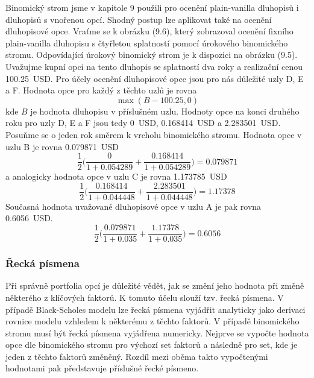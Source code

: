 \documentclass[a4paper]{book}
\begin{document}
Binomický strom jsme v kapitole 9 použili pro ocenění plain-vanilla dluhopisů i dluhopisů s vnořenou opcí. Shodný postup lze aplikovat také na ocenění dluhopisové opce. Vraťme se k obrázku (9.6), který zobrazoval ocenění fixního plain-vanilla dluhopisu s čtyřletou splatností pomocí úrokového binomického stromu. Odpovídající úrokový binomický strom je k dispozici na obrázku (9.5). Uvažujme kupní opci na tento dluhopis se splatností dva roky a realizační cenou 100.25~USD. Pro účely ocenění dluhopisové opce jsou pro nás důležité uzly D, E a F. Hodnota opce pro každý z těchto uzlů je rovna
\begin{equation*}
\max(B - 100.25, 0)
\end{equation*}
kde $B$ je hodnota dluhopisu v příslušném uzlu. Hodnoty opce na konci druhého roku pro uzly D, E a F jsou tedy 0~USD, 0.168414~USD a 2.283501~USD. Posuňme se o jeden rok směrem k vrcholu binomického stromu. Hodnota opce v uzlu B je rovna 0.079871~USD
\begin{equation*}
\frac{1}{2}\Bigg( \frac{0}{1 + 0.054289} + \frac{0.168414}{1 + 0.054289} \Bigg) = 0.079871
\end{equation*}
a analogicky hodnota opce v uzlu C je rovna 1.173785~USD
\begin{equation*}
\frac{1}{2}\Bigg( \frac{0.168414}{1 + 0.044448} + \frac{2.283501}{1 + 0.044448} \Bigg) = 1.17378
\end{equation*}
Současná hodnota uvažované dluhopisové opce v uzlu A je pak rovna 0.6056~USD.
\begin{equation*}
\frac{1}{2}\Bigg( \frac{0.079871}{1 + 0.035} + \frac{1.17378}{1 + 0.035} \Bigg) = 0.6056
\end{equation*}

\subsubsection{Řecká písmena}

Při správně portfolia opcí je důležité vědět, jak se změní jeho hodnota při změně některého z klíčových faktorů. K tomuto účelu slouží tzv. řecká písmena. V případě Black-Scholes modelu lze řecká písmena vyjádřit analyticky jako derivaci rovnice modelu vzhledem k některému z těchto faktorů. V případě binomického stromu musí být řecká písmena vyjádřena numericky. Nejprve se vypočte hodnota opce dle binomického stromu pro výchozí set faktorů a následně pro set, kde je jeden z těchto faktorů změněný. Rozdíl mezi oběma takto vypočtenými hodnotami pak představuje příslušné řecké písmeno.
\end{document}
